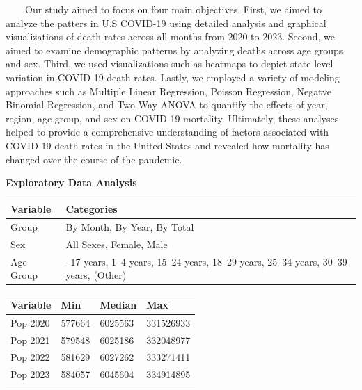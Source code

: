 \documentclass[
]{article}
\begin{document}
~~~~Our study aimed to focus on four main objectives. First, we aimed to
analyze the patters in U.S COVID-19 using detailed analysis and
graphical visualizations of death rates across all months from 2020 to
2023. Second, we aimed to examine demographic patterns by analyzing
deaths across age groups and sex. Third, we used visualizations such as
heatmaps to depict state-level variation in COVID-19 death rates.
Lastly, we employed a variety of modeling approaches such as Multiple
Linear Regression, Poisson Regression, Negatve Binomial Regression, and
Two-Way ANOVA to quantify the effects of year, region, age group, and
sex on COVID-19 mortality. Ultimately, these analyses helped to provide
a comprehensive understanding of factors associated with COVID-19 death
rates in the United States and revealed how mortality has changed over
the course of the pandemic.

\textbf{\large Exploratory Data Analysis}

\begin{center}
\end{center}

\begin{longtable}[]{@{}
  >{\raggedright\arraybackslash}p{}
  >{\raggedright\arraybackslash}p{}@{}}
\toprule\noalign{}
\begin{minipage}[b]{\linewidth}\raggedright
\textbf{Variable}
\end{minipage} & \begin{minipage}[b]{\linewidth}\raggedright
\textbf{Categories}
\end{minipage} \\
\midrule\noalign{}
\endhead
\bottomrule\noalign{}
\endlastfoot
Group & By Month, By Year, By Total \\
Sex & All Sexes, Female, Male \\
Age Group & 0--17 years, 1--4 years, 15--24 years, 18--29 years, 25--34
years, 30--39 years, (Other) \\
\end{longtable}

\begin{center}
\end{center}

\begin{longtable}[]{@{}llll@{}}
\toprule\noalign{}
\textbf{Variable} & \textbf{Min} & \textbf{Median} & \textbf{Max} \\
\midrule\noalign{}
\endhead
\bottomrule\noalign{}
\endlastfoot
Pop 2020 & 577664 & 6025563 & 331526933 \\
Pop 2021 & 579548 & 6025186 & 332048977 \\
Pop 2022 & 581629 & 6027262 & 333271411 \\
Pop 2023 & 584057 & 6045604 & 334914895 \\
\end{longtable}
\end{document}
